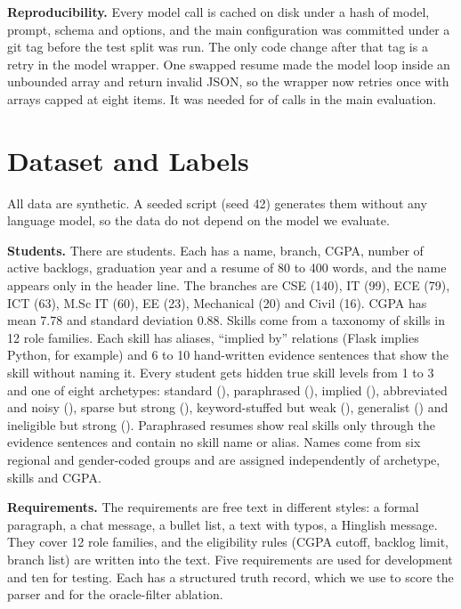 \documentclass[conference]{IEEEtran}
\begin{document}
\textbf{Reproducibility.} Every model call is cached on disk under a hash of model, prompt, schema and options, and the main configuration was committed under a git tag before the test split was run. The only code change after that tag is a retry in the model wrapper. One swapped resume made the model loop inside an unbounded array and return invalid JSON, so the wrapper now retries once with arrays capped at eight items. It was needed for \CallsFallback{} of \CallsMain{} calls in the main evaluation.

\section{Dataset and Labels}
All data are synthetic. A seeded script (seed 42) generates them without any language model, so the data do not depend on the model we evaluate.

\textbf{Students.} There are \NStudents{} students. Each has a name, branch, CGPA, number of active backlogs, graduation year and a resume of 80 to 400 words, and the name appears only in the header line. The branches are CSE (140), IT (99), ECE (79), ICT (63), M.Sc IT (60), EE (23), Mechanical (20) and Civil (16). CGPA has mean 7.78 and standard deviation 0.88. Skills come from a taxonomy of \NSkills{} skills in 12 role families. Each skill has aliases, ``implied by'' relations (Flask implies Python, for example) and 6 to 10 hand-written evidence sentences that show the skill without naming it. Every student gets hidden true skill levels from 1 to 3 and one of eight archetypes: standard (\NArchStandard{}), paraphrased (\NArchParaphrased{}), implied (\NArchImplied{}), abbreviated and noisy (\NArchAbbreviatedNoisy{}), sparse but strong (\NArchSparseStrong{}), keyword-stuffed but weak (\NArchStuffedWeak{}), generalist (\NArchGeneralistAverage{}) and ineligible but strong (\NArchIneligibleStrong{}). Paraphrased resumes show real skills only through the evidence sentences and contain no skill name or alias. Names come from six regional and gender-coded groups and are assigned independently of archetype, skills and CGPA.

\textbf{Requirements.} The \NRequirements{} requirements are free text in different styles: a formal paragraph, a chat message, a bullet list, a text with typos, a Hinglish message. They cover 12 role families, and the eligibility rules (CGPA cutoff, backlog limit, branch list) are written into the text. Five requirements are used for development and ten for testing. Each has a structured truth record, which we use to score the parser and for the oracle-filter ablation.
\end{document}
